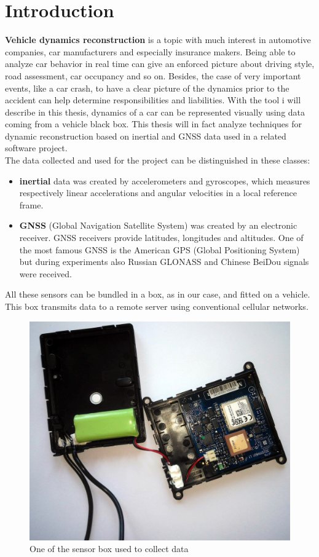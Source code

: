 \chapter{Introduction}
\label{chap:intro}

\textbf{Vehicle dynamics reconstruction} is a topic with much interest in automotive companies, car manufacturers and especially insurance makers.
Being able to analyze car behavior in real time can give an enforced picture about driving style, road assessment, car occupancy and so on. Besides, the case of very important events, like a car crash, to have a clear picture of the dynamics prior to the accident can help determine responsibilities and liabilities.
With the tool i will describe in this thesis, dynamics of a car can be represented visually using data coming from a vehicle black box.
This thesis will in fact analyze techniques for dynamic reconstruction based on inertial and GNSS data used in a related software project. \\
The data collected and used for the project can be distinguished in these classes:
\begin{itemize}
\item \textbf{inertial} data was created by accelerometers and gyroscopes, which measures respectively linear accelerations and angular velocities in a local reference frame. 
\item \textbf{GNSS} (Global Navigation Satellite System) was created by an electronic receiver. GNSS receivers provide latitudes, longitudes and altitudes. One of the most famous GNSS is the American GPS (Global Positioning System) but during experiments also Russian GLONASS and Chinese BeiDou signals were received. 
\end{itemize}
All these sensors can be bundled in a box, as in our case, and fitted on a vehicle. This box transmits data to a remote server using conventional cellular networks. 

\begin{figure}[H]
\includegraphics[width=\linewidth]{box.jpg}
\caption{One of the sensor box used to collect data}
\end{figure}


